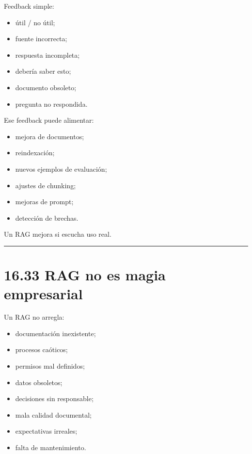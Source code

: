 Feedback simple:

\begin{itemize}
\tightlist
\item
  útil / no útil;
\item
  fuente incorrecta;
\item
  respuesta incompleta;
\item
  debería saber esto;
\item
  documento obsoleto;
\item
  pregunta no respondida.
\end{itemize}

Ese feedback puede alimentar:

\begin{itemize}
\tightlist
\item
  mejora de documentos;
\item
  reindexación;
\item
  nuevos ejemplos de evaluación;
\item
  ajustes de chunking;
\item
  mejoras de prompt;
\item
  detección de brechas.
\end{itemize}

Un RAG mejora si escucha uso real.

\begin{center}\rule{0.5\linewidth}{0.5pt}\end{center}

\section{16.33 RAG no es magia
empresarial}\label{rag-no-es-magia-empresarial}

Un RAG no arregla:

\begin{itemize}
\tightlist
\item
  documentación inexistente;
\item
  procesos caóticos;
\item
  permisos mal definidos;
\item
  datos obsoletos;
\item
  decisiones sin responsable;
\item
  mala calidad documental;
\item
  expectativas irreales;
\item
  falta de mantenimiento.
\end{itemize}

